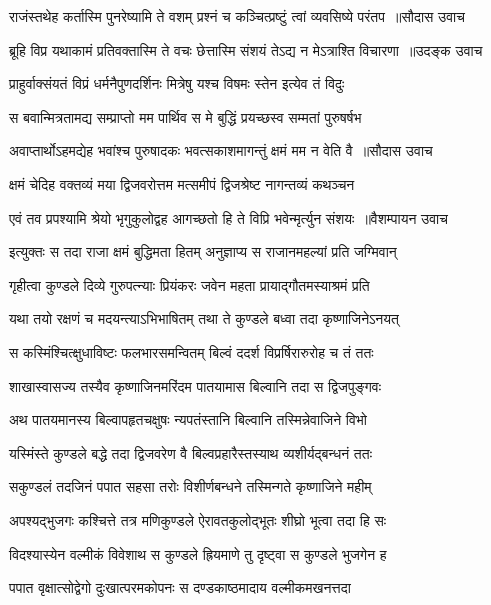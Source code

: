 \threelineshloka
{राजंस्तथेह कर्तास्मि पुनरेष्यामि ते वशम्}
{प्रश्नं च कञ्चित्प्रष्टुं त्वां व्यवसिष्ये परंतप ॥सौदास उवाच}
{}


\threelineshloka
{ब्रूहि विप्र यथाकामं प्रतिवक्तास्मि ते वचः}
{छेत्तास्मि संशयं तेऽद्य न मेऽत्राश्ति विचारणा ॥उदङ्क उवाच}
{}


\twolineshloka
{प्राहुर्वाक्संयतं विप्रं धर्मनैपुणदर्शिनः}
{मित्रेषु यश्च विषमः स्तेन इत्येव तं विदुः}


\twolineshloka
{स बवान्मित्रतामद्य सम्प्राप्तो मम पार्थिव}
{स मे बुद्धिं प्रयच्छस्व सम्मतां पुरुषर्षभ}


\threelineshloka
{अवाप्तार्थोऽहमद्येह भवांश्च पुरुषादकः}
{भवत्सकाशमागन्तुं क्षमं मम न वेति वै ॥सौदास उवाच}
{}


\twolineshloka
{क्षमं चेदिह वक्तव्यं मया द्विजवरोत्तम}
{मत्समीपं द्विजश्रेष्ट नागन्तव्यं कथञ्चन}


\threelineshloka
{एवं तव प्रपश्यामि श्रेयो भृगुकुलोद्वह}
{आगच्छतो हि ते विप्रि भवेन्मृर्त्युन संशयः ॥वैशम्पायन उवाच}
{}


\twolineshloka
{इत्युक्तः स तदा राजा क्षमं बुद्धिमता हितम्}
{अनुज्ञाप्य स राजानमहल्यां प्रति जग्मिवान्}


\twolineshloka
{गृहीत्वा कुण्डले दिव्ये गुरुपत्न्याः प्रियंकरः}
{जवेन महता प्रायाद्गौतमस्याश्रमं प्रति}


\twolineshloka
{यथा तयो रक्षणं च मदयन्त्याऽभिभाषितम्}
{तथा ते कुण्डले बध्वा तदा कृष्णाजिनेऽनयत्}


\twolineshloka
{स कस्मिंश्चित्क्षुधाविष्टः फलभारसमन्वितम्}
{बिल्वं ददर्श विप्रर्षिरारुरोह च तं ततः}


\twolineshloka
{शाखास्वासज्य तस्यैव कृष्णाजिनमरिंदम}
{पातयामास बिल्वानि तदा स द्विजपुङ्गवः}


\twolineshloka
{अथ पातयमानस्य बिल्वापहृतचक्षुषः}
{न्यपतंस्तानि बिल्वानि तस्मिन्नेवाजिने विभो}


\twolineshloka
{यस्मिंस्ते कुण्डले बद्धे तदा द्विजवरेण वै}
{बिल्वप्रहारैस्तस्याथ व्यशीर्यद्बन्धनं ततः}


\twolineshloka
{सकुण्डलं तदजिनं पपात सहसा तरोः}
{विशीर्णबन्धने तस्मिन्गते कृष्णाजिने महीम्}


\twolineshloka
{अपश्यद्भुजगः कश्चित्ते तत्र मणिकुण्डले}
{ऐरावतकुलोद्भूतः शीघ्रो भूत्वा तदा हि सः}


\twolineshloka
{विदश्यास्येन वल्मीकं विवेशाथ स कुण्डले}
{ह्रियमाणे तु दृष्ट्वा स कुण्डले भुजगेन ह}


\twolineshloka
{पपात वृक्षात्सोद्वेगो दुःखात्परमकोपनः}
{स दण्डकाष्ठमादाय वल्मीकमखनत्तदा}


